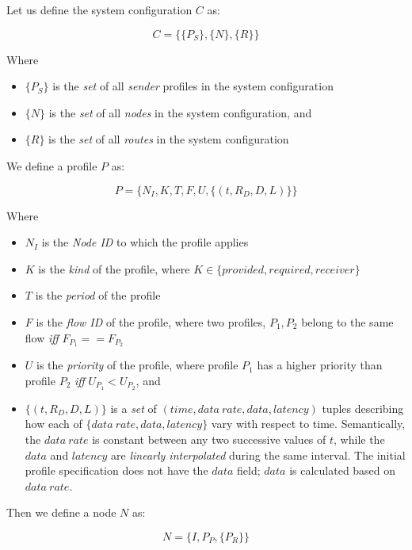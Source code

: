 Let us define the system configuration $C$ as:

\begin{equation}
  C = \{\{P_S\},\{N\},\{R\}\}
\end{equation}

Where

\begin{itemize}
\item $\{P_S\}$ is the \emph{set} of all \emph{sender} profiles in the system
  configuration
\item $\{N\}$ is the \emph{set} of all \emph{nodes} in the system configuration, and
\item $\{R\}$ is the \emph{set} of all \emph{routes} in the system configuration
\end{itemize}

We define a profile $P$ as:

\begin{equation}
  P = \{N_I,K,T,F,U,\{(t,R_D,D,L)\}\}
\end{equation}

Where

\begin{itemize}
\item $N_I$ is the \emph{Node ID} to which the profile applies
\item $K$ is the \emph{kind} of the profile, where
  $K\in\{provided,required,receiver\}$
\item $T$ is the \emph{period} of the profile
\item $F$ is the \emph{flow ID} of the profile, where two profiles,
  $P_1,P_2$ belong to the same flow \emph{iff}
  $F_{P_1}==F_{P_2}$
\item $U$ is the \emph{priority} of the profile, where profile
  $P_1$ has a higher priority than profile $P_2$ \emph{iff}
  $U_{P_1} < U_{P_2}$, and
\item $\{(t,R_D,D,L)\}$ is a \emph{set} of $(time, data\ rate,
  data, latency)$ tuples describing how each of $\{data\ rate,
  data, latency\}$ vary with respect to time.  Semantically, the
  $data\ rate$ is constant between any two successive values of
  $t$, while the $data$ and $latency$ are \emph{linearly
  interpolated} during the same interval.  The initial profile
  specification does not have the $data$ field; $data$ is
  calculated based on $data\ rate$.
\end{itemize}

Then we define a node $N$ as:

\begin{equation}
  N = \{I,P_P,\{P_R\}\}
\end{equation}

